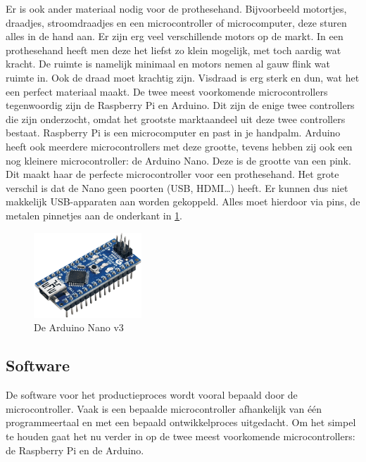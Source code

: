 Er is ook ander materiaal nodig voor de prothesehand. Bijvoorbeeld
motortjes, draadjes, stroomdraadjes en een microcontroller of
microcomputer, deze sturen alles in de hand aan. Er zijn erg veel
verschillende motors op de markt. In een prothesehand heeft men deze het
liefst zo klein mogelijk, met toch aardig wat kracht. De ruimte is
namelijk minimaal en motors nemen al gauw flink wat ruimte in. Ook de
draad moet krachtig zijn. Visdraad is erg sterk en dun, wat het een
perfect materiaal maakt. De twee meest voorkomende microcontrollers
tegenwoordig zijn de Raspberry Pi en Arduino. Dit zijn de enige twee
controllers die zijn onderzocht, omdat het grootste marktaandeel uit
deze twee controllers bestaat. Raspberry Pi is een microcomputer en past
in je handpalm. Arduino heeft ook meerdere microcontrollers met deze
grootte, tevens hebben zij ook een nog kleinere microcontroller: de
Arduino Nano. Deze is de grootte van een pink. Dit maakt haar de
perfecte microcontroller voor een prothesehand. Het grote verschil is
dat de Nano geen poorten (USB, HDMI\ldots{}) heeft. Er kunnen dus niet
makkelijk USB-apparaten aan worden gekoppeld. Alles moet hierdoor via
pins, de metalen pinnetjes aan de onderkant in
\cref{fig:nano}.

\begin{figure}
\centering
\includegraphics[width=0.36\textwidth,height=\textheight]{img/image_11.png}
\caption{De Arduino Nano v3\label{fig:nano}}
\end{figure}

\hypertarget{software}{%
\subsection{Software}\label{software}}

De software voor het productieproces wordt vooral bepaald door de
microcontroller. Vaak is een bepaalde microcontroller afhankelijk van
één programmeertaal en met een bepaald ontwikkelproces uitgedacht. Om
het simpel te houden gaat het nu verder in op de twee meest voorkomende
microcontrollers: de Raspberry Pi en de Arduino.

